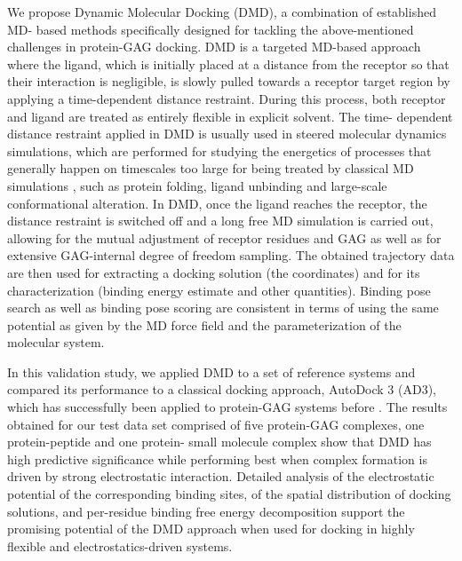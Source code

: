 We propose Dynamic Molecular Docking (DMD), a combination of established MD-
based methods specifically designed for tackling the above-mentioned challenges
in protein-GAG docking. DMD is a targeted MD-based approach where the ligand,
which is initially placed at a distance from the receptor so that their
interaction is negligible, is slowly pulled towards a receptor target region by
applying a time-dependent distance restraint. During this process, both receptor
and ligand are treated as entirely flexible in explicit solvent. The time-
dependent distance restraint applied in DMD is usually used in steered molecular
dynamics simulations, which are performed for studying the energetics of
processes that generally happen on timescales too large for being treated by
classical MD simulations \cite{xiong_free_2006}, such as protein folding, ligand
unbinding and large-scale conformational alteration. In DMD, once the ligand
reaches the receptor, the distance restraint is switched off and a long free MD
simulation is carried out, allowing for the mutual adjustment of receptor
residues and GAG as well as for extensive GAG-internal degree of freedom
sampling. The obtained trajectory data are then used for extracting a docking
solution (the coordinates) and for its characterization (binding energy estimate
and other quantities). Binding pose search as well as binding pose scoring are
consistent in terms of using the same potential as given by the MD force field
and the parameterization of the molecular system.

In this validation study, we applied DMD to a set of reference systems and
compared its performance to a classical docking approach, AutoDock 3 (AD3),
which has successfully been applied to protein-GAG systems before
{\cite{japan_docking_ad3_clustering, samsonov_docking_2011,
pichert_characterization_2012}}. The results obtained for our test data set
comprised of five protein-GAG complexes, one protein-peptide and one protein-
small molecule complex show that DMD has high predictive significance while
performing best when complex formation is driven by strong electrostatic
interaction. Detailed analysis of the electrostatic potential of the
corresponding binding sites, of the spatial distribution of docking solutions,
and per-residue binding free energy decomposition support the promising
potential of the DMD approach when used for docking in highly flexible and
electrostatics-driven systems.

